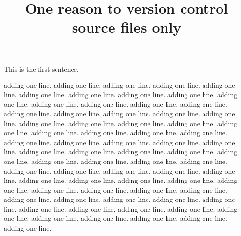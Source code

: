 \documentclass{article}
\title{One reason to version control source files only}
\begin{document}
\maketitle

This is the first sentence.

adding one line.
adding one line.
adding one line.
adding one line.
adding one line.
adding one line.
adding one line.
adding one line.
adding one line.
adding one line.
adding one line.
adding one line.
adding one line.
adding one line.
adding one line.
adding one line.
adding one line.
adding one line.
adding one line.
adding one line.
adding one line.
adding one line.
adding one line.
adding one line.
adding one line.
adding one line.
adding one line.
adding one line.
adding one line.
adding one line.
adding one line.
adding one line.
adding one line.
adding one line.
adding one line.
adding one line.
adding one line.
adding one line.
adding one line.
adding one line.
adding one line.
adding one line.
adding one line.
adding one line.
adding one line.
adding one line.
adding one line.
adding one line.
adding one line.
adding one line.
adding one line.
adding one line.
adding one line.
adding one line.
adding one line.
adding one line.
adding one line.
adding one line.
adding one line.
adding one line.
adding one line.
adding one line.
adding one line.
adding one line.
adding one line.
adding one line.
adding one line.
adding one line.
adding one line.
adding one line.
adding one line.
\end{document}
